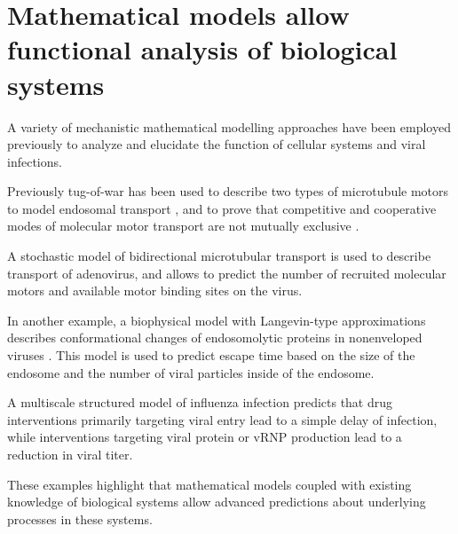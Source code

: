 \section{Mathematical models allow functional analysis of biological systems}

A variety of mechanistic mathematical modelling approaches have been employed previously to analyze and elucidate the function of cellular systems and viral infections.

Previously tug-of-war has been used to describe two types of microtubule motors to model endosomal transport \cite{muller2008tug}, and to prove that competitive and cooperative modes of molecular motor transport are not mutually exclusive \cite{muller2008tug}.

A stochastic model of bidirectional microtubular transport \cite{gazzola2009stochastic} is used to describe transport of adenovirus, and allows to predict the number of recruited molecular motors and available motor binding sites on the virus.

In another example, a biophysical model with  Langevin-type approximations  describes conformational changes of endosomolytic proteins in nonenveloped viruses \cite{lagache2012modeling}. This model is used to predict escape time based on the size of the endosome and the number of viral particles inside of the endosome.

A multiscale structured model of influenza infection \cite{heldt2013multiscale} predicts that drug interventions primarily targeting viral entry lead to a simple delay of infection, while interventions targeting viral protein or vRNP  production lead to a reduction in viral titer.

These examples highlight that mathematical models coupled with existing knowledge of biological systems allow advanced predictions about underlying processes in these systems.